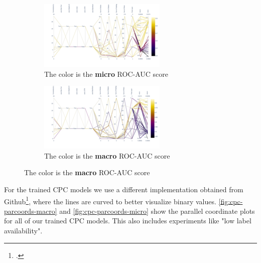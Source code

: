 \begin{figure}[H]
	\caption{Parallel Coordinates Plot for all trained baseline networks from \autoref{tbl:aucscores-avg-bl-class-stab}.}
	\begin{subfigure}[t]{0.95\textwidth}\centering
		\includegraphics[width=1\linewidth]{bilder/bl-attributes-parallelcoordsmicro.png}
		\caption{The color is the \textbf{micro} ROC-AUC score}
		\label{fig:bl-parcoords-micro}	
	\end{subfigure}%
	
	\begin{subfigure}[t]{0.95\textwidth}\centering
		\includegraphics[width=1\linewidth]{bilder/bl-attributes-parallelcoordsmacro.png}
		\caption{The color is the \textbf{macro} ROC-AUC score}
		\label{fig:bl-parcoords-macro}	
	\end{subfigure}
\end{figure}

For the trained CPC models we use a different implementation obtained from Github\footcite{https://github.com/jraine/parallel-coordinates-plot-dataframe/blob/master/parallel_plot.py}, where the lines are curved to better visualize binary values. \autoref{fig:cpc-parcoords-macro} and \autoref{fig:cpc-parcoords-micro} show the parallel coordinate plots for all of our trained CPC models. This also includes experiments like "low label availability".

